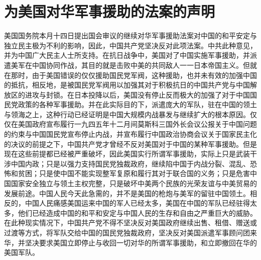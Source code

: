 \section[为美国对华军事援助的法案的声明（一九四六年六月二十二日）]{为美国对华军事援助的法案的声明}


美国国务院本月十四日提出国会审议的继续对华军事援助法案对中国的和平安定与独立民主极为不利的影响，因此，中国共产党坚决反对此项法案。中共此种意见，并为中国广大民主人士所支持。在抗日战争中，美国对了中国实施军事援助，并派遣美军在中国协同作战，其目的就是击败中美的共同敌人一一日本帝国主义。但就在那时，由于美国错误的仅仅援助国民党军阀，这种援助，也并未有效的加强中国的抵抗，相反地，是被国民党军阀用以加强其对于积极抗日的中国共产党与中国解放区的进攻与封锁。在日本投降以后，美国没有停止反而极大的加强了对于中国国民党政策的各种军事援助。并在此实际目的下，派遣庞大的军队，驻在中国的领土与领海之上，这种行动已经证明是中国大规模内战暴发与继续扩大的根本原因。仅仅在美国政府宣布履行一九四五年十二月间莫斯科三国外长会议公报关于中国问题的约束与中国国民党宣布停止内战，并宣布履行中国政治协商会议关于国家民主化的决议的前提之下，中国共产党才曾经不反对美国对于中国的某种军事援助。但是现在这些前提都已经被严重破坏，因此美国实行所谓军事援助，实际上只是武装干涉中国内政；只是以强力支持国民党独裁政府，继续陷中国于内战分裂、混乱、恐怖和贫困；只是使中国不能实现整军复原和履行其对于联合国的义务；只是危害中国国家安全独立与领土主权完整，只是破坏中美两个民族的光荣友谊与中美贸易的发展前途。中国人民今天此急需的，并不是美国的枪炮与美军的留驻中国领土。相反的，中国人民痛感美国运来中国的军人已经太多，美国在中国的军队已经驻得太多，他们已经造成中国的和平和安定与中国人民的生存和自由之严重巨大的威胁。在此种现实情况下，中国共产党不得不坚决反对美国政府继续出售、租借、赠送或过渡等方式，将军队交给中国的国民党独裁政府，坚决反对美国派遣军事顾问团来华，并坚决要求美国立即停止与收回一切对华的所谓军事援助，和立即撤回在华的美国军队。

